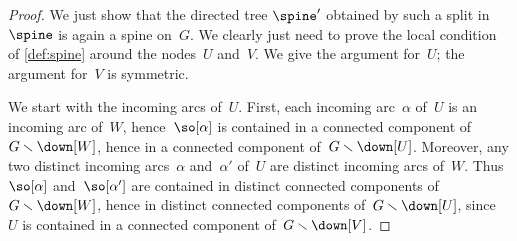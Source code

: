 \documentclass{amsart}
\theoremstyle{definition}
\newcommand{\ssm}{\smallsetminus} %
\begin{document}
\begin{proof}
  We just show that the directed tree $\spine'$ obtained by such a split in $\spine$ is again a spine on~$G$.
  We clearly just need to prove the local condition of \cref{def:spine} around the nodes~$U$ and~$V$.
  We give the argument for~$U$; the argument for~$V$ is symmetric.
  
  We start with the incoming arcs of~$U$.
  First, each incoming arc~$\alpha$ of~$U$ is an incoming arc of~$W$, hence~$\so[\alpha]$ is contained in a connected component of~$G \ssm \down[W]$, hence in a connected component of~$G \ssm \down[U]$.
  Moreover, any two distinct incoming arcs~$\alpha$ and~$\alpha'$ of~$U$ are distinct incoming arcs of~$W$. Thus~$\so[\alpha]$ and~$\so[\alpha']$ are contained in distinct connected components of~$G \ssm \down[W]$, hence in distinct connected components of~$G \ssm \down[U]$, since~$U$ is contained in a connected component of~$G \ssm \down[V]$.


\end{proof}
\end{document}
